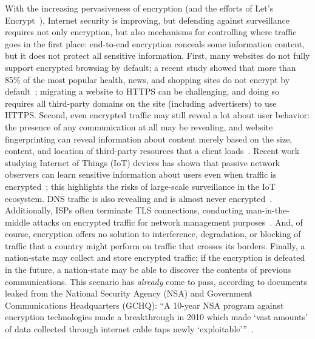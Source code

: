 With the increasing pervasiveness of encryption (and the efforts of Let's Encrypt~\cite{aas2014let}), 
Internet security is improving, but defending against surveillance requires not only encryption, but
also mechanisms for controlling where traffic goes in the first place:
end-to-end 
encryption conceals some information content, but it does not protect
all sensitive information.  First, many websites do not fully support
encrypted browsing by default; a recent study showed that more than 85\% of
the most popular health, news, and shopping sites do not encrypt by
default~\cite{what_isps_can_see}; migrating a website to HTTPS can be challenging,
and doing so requires all third-party domains on the site (including
advertisers) to use HTTPS.  Second, even encrypted traffic may still reveal a
lot about user behavior: the presence of any communication at all may be
revealing, and website fingerprinting can reveal information about content
merely based on the size, content, and location of third-party resources that
a client loads~\cite{Johnson2013a}. Recent work studying Internet of Things (IoT) devices 
has shown that passive network observers can learn sensitive information about users 
even when traffic is encrypted~\cite{apthorpe2016poster}; this highlights the risks of large-scale surveillance 
in the IoT ecosystem. DNS traffic is also revealing and is
almost never encrypted~\cite{what_isps_can_see}.  Additionally, ISPs often
terminate TLS connections, conducting man-in-the-middle attacks on encrypted
traffic for network management purposes~\cite{mitm_isp}.  And, of course,
encryption offers no solution to interference, degradation, or blocking of
traffic that a country might perform on traffic that crosses its borders.
Finally, a nation-state may collect and store encrypted traffic; if the
encryption is defeated in the future, a nation-state may be able to discover the
contents of previous communications.  This scenario has {\em already} come to pass,
according to
documents leaked from the National Security Agency (NSA) and Government Communications 
Headquarters (GCHQ): ``A 10-year NSA program against encryption technologies made a breakthrough in 2010 which made `vast amounts' of data collected through internet cable taps newly `exploitable'''~\cite{encryption_forward}.

